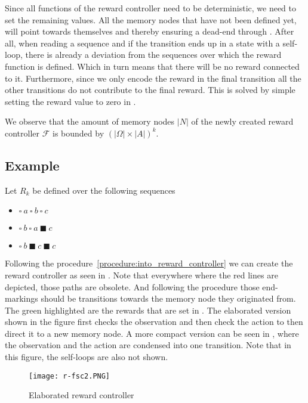 Since all functions of the reward controller need to be deterministic, we need to set the remaining values. All the memory nodes that have not been defined yet, will point towards themselves and thereby ensuring a dead-end through . After all, when reading a sequence and if the transition ends up in a state with a self-loop, there is already a deviation from the sequences over which the reward function is defined. Which in turn means that there will be no reward connected to it. Furthermore, since we only encode the reward in the final transition all the other transitions do not contribute to the final reward. This is solved by simple setting the reward value to zero in .


We observe that the amount of memory nodes $|N|$ of the newly created reward controller $\mathcal{F}$ is bounded by $(|\Omega|\times|A|)^k$.\\


\subsection*{Example}
Let $R_k$ be defined over the following sequences
\begin{itemize}
	\item $\square\ a\ \square\ b\ \square\ c$
	\item $\square\ b\ \square\ a\ \blacksquare\ c$
	\item $\square\ b\ \blacksquare\ c\ \blacksquare\ c$
\end{itemize}

Following the procedure~\ref{procedure:into_reward_controller} we can create the reward controller as seen in . Note that everywhere where the red lines are depicted, those paths are obsolete. And following the procedure those end-markings should be transitions towards the memory node they originated from. The green highlighted are the rewards that are set in . The elaborated version shown in the figure first checks the observation and then check the action to then direct it to a new memory node. A more compact version can be seen in , where the observation and the action are condensed into one transition. Note that in this figure, the self-loops are also not shown. 

\begin{figure}[H]
\centering
\texttt{[image: r-fsc2.PNG]}
\label{f:elaborated_rc}
\caption{Elaborated reward controller}
\end{figure}


